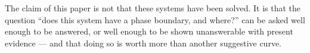 The claim of this paper is not that these systems have been solved. It is that
the question ``does this system have a phase boundary, and where?'' can be
asked well enough to be answered, or well enough to be shown unanswerable with
present evidence --- and that doing so is worth more than another suggestive
curve.

